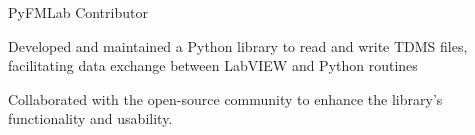 
\begin{cventries}

  \cventry
    {PyFMLab}
    {Contributor}
    {}
    {} 
    {
      \begin{cvitems}
        \item{Developed and maintained a Python library to read and write TDMS files, facilitating data exchange between LabVIEW and Python routines}
        \item{Collaborated with the open-source community to enhance the library's functionality and usability.}
      \end{cvitems}
    }

\end{cventries}
